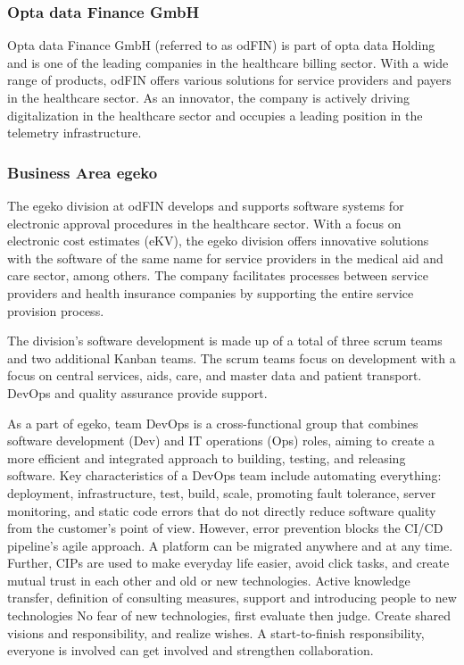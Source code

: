 \subsubsection{Opta data Finance GmbH  }
Opta data Finance GmbH (referred to as odFIN) is part of opta data Holding and is one of the leading companies in the healthcare billing sector. With a wide range of products, odFIN offers various solutions for service providers and payers in the healthcare sector. As an innovator, the company is actively driving digitalization in the healthcare sector and occupies a leading position in the telemetry infrastructure.

\subsubsection{Business Area egeko }
The egeko division at odFIN develops and supports software systems for electronic approval procedures in the healthcare sector. With a focus on electronic cost estimates (eKV), the egeko division offers innovative solutions with the software of the same name for service providers in the medical aid and care sector, among others. The company facilitates processes between service providers and health insurance companies by supporting the entire service provision process.\vspace{.4cm}

The division's software development is made up of a total of three scrum teams and two additional Kanban teams. The scrum teams focus on development with a focus on central services, aids, care, and master data and patient transport. DevOps and quality assurance provide support.\vspace{.4cm} 

As a part of egeko, team DevOps is a cross-functional group that combines software development (Dev) and IT operations (Ops) roles, aiming to create a more efficient and integrated approach to building, testing, and releasing software. Key characteristics of a DevOps team include automating everything: deployment, infrastructure, test, build, scale, promoting fault tolerance, server monitoring, and static code errors that do not directly reduce software quality from the customer's point of view. However, error prevention blocks the CI/CD pipeline's agile approach. A platform can be migrated anywhere and at any time. Further, CIPs are used to make everyday life easier, avoid click tasks, and create mutual trust in each other and old or new technologies. Active knowledge transfer, definition of consulting measures, support and introducing people to new technologies No fear of new technologies, first evaluate then judge. Create shared visions and responsibility, and realize wishes. A start-to-finish responsibility, everyone is involved can get involved and strengthen collaboration.\vspace{.4cm}

